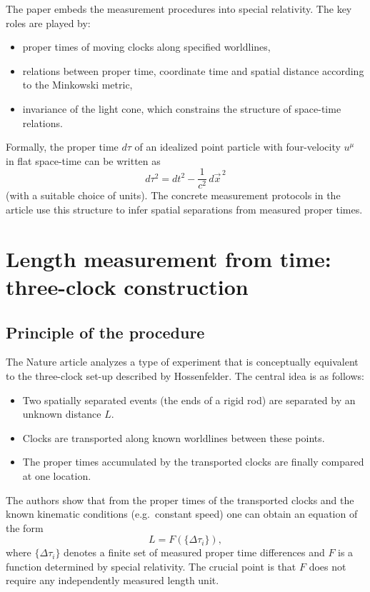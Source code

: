 The paper embeds the measurement procedures into special relativity. The key
roles are played by:
\begin{itemize}
  \item proper times of moving clocks along specified worldlines,
  \item relations between proper time, coordinate time and spatial distance
        according to the Minkowski metric,
  \item invariance of the light cone, which constrains the structure of
        space-time relations.
\end{itemize}

Formally, the proper time $d\tau$ of an idealized point particle with
four-velocity $u^\mu$ in flat space-time can be written as
\begin{equation}
  d\tau^2 = dt^2 - \frac{1}{c^2} \, d\vec{x}^{\,2}
\end{equation}
(with a suitable choice of units). The concrete measurement protocols in the
article use this structure to infer spatial separations from measured proper
times.

\section{Length measurement from time: three-clock construction}

\subsection{Principle of the procedure}

The Nature article analyzes a type of experiment that is conceptually
equivalent to the three-clock set-up described by Hossenfelder. The central
idea is as follows:
\begin{itemize}
  \item Two spatially separated events (the ends of a rigid rod) are separated
        by an unknown distance $L$.
  \item Clocks are transported along known worldlines between these points.
  \item The proper times accumulated by the transported clocks are finally
        compared at one location.
\end{itemize}

The authors show that from the proper times of the transported clocks and the
known kinematic conditions (e.g.\ constant speed) one can obtain an equation of
the form
\begin{equation}
  L = F\left(\{\Delta \tau_i\}\right),
\end{equation}
where $\{\Delta \tau_i\}$ denotes a finite set of measured proper time
differences and $F$ is a function determined by special relativity. The crucial
point is that $F$ does not require any independently measured length unit.

